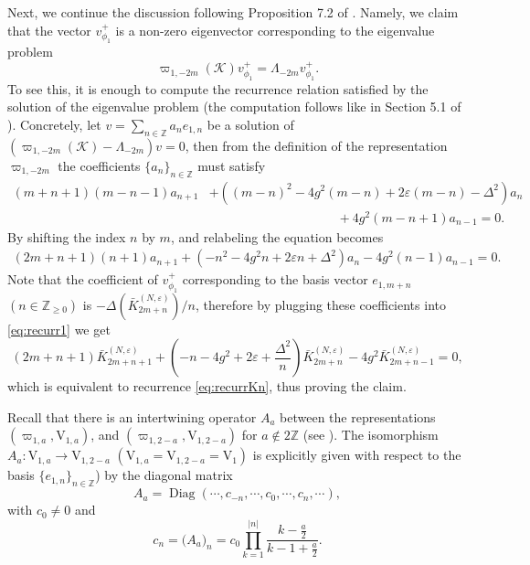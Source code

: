 \documentclass[11pt]{article}
\numberwithin{equation}{section}
\newcommand{\Z}{\mathbb{Z}} %
\newcommand{\e}{\varepsilon}
\DeclareMathOperator{\Diag}{Diag}
\newcommand{\RpnSymbol}[1]{\bm{\mathrm{#1}}}
\newcommand{\rV}{\RpnSymbol{V}}
\theoremstyle{plain}
\theoremstyle{definition}
\theoremstyle{remark}
\begin{document}
Next, we continue the discussion following Proposition 7.2 of \cite{W2016JPA}.
Namely, we claim that the vector \(v^+_{\phi_1}\) is a non-zero eigenvector corresponding to the eigenvalue problem
\begin{equation}
  \label{eq:Eigen$-2m$}
  \varpi_{1,-2m}(\mathcal{K})v^+_{\phi_1} = \Lambda_{-2m} v^+_{\phi_1}.
\end{equation}
To see this, it is enough to compute the recurrence relation satisfied by the solution of the eigenvalue problem (the computation
follows like in Section 5.1 of \cite{W2016JPA}). Concretely, let \( v = \sum_{n \in \Z} a_n e_{1,n} \) be a solution of
\(\left(\varpi_{1,-2m}(\mathcal{K}) - \Lambda_{-2m}\right) v=0\), then from the definition of the representation \(\varpi_{1,-2m}\) the
coefficients \(\{a_n\}_{n \in \Z} \) must satisfy
\begin{align*}
  (m+n+1) (m-n-1) a_{n+1} &+ \left( (m-n)^2 - 4g^2 (m-n) + 2\e (m-n) - \Delta^2 \right)a_n \\
  &\qquad \qquad \qquad \qquad \qquad + 4g^2 (m-n+1) a_{n-1} = 0.
\end{align*}
By shifting the index \(n\) by \(m\), and relabeling the equation becomes
\begin{align}
  \label{eq:recurr1}
  (2m+n+1)(n+1) a_{n+1} +\left( -n^2 - 4g^2 n + 2\e n + \Delta^2 \right) a_n - 4g^2 (n-1) a_{n-1} = 0.
\end{align}
Note that the coefficient of \( v^+_{\phi_1} \) corresponding to the basis vector \( e_{1,m+n} \) \((n \in \Z_{\geq 0}) \) is
\( -\Delta (\bar{K}^{(N,\e)}_{2m + n})/n \), therefore by plugging these coefficients into \eqref{eq:recurr1} we get
\begin{equation*}
  (2m+n+1) \bar{K}^{(N,\e)}_{2m+n+1} +\left( -n - 4g^2 + 2\e + \frac{\Delta^2}{n} \right)\bar{K}^{(N,\e)}_{2m+n}
   - 4g^2  \bar{K}^{(N,\e)}_{2m+n-1} = 0,
\end{equation*}
which is equivalent to recurrence \eqref{eq:recurrKn}, thus proving the claim.

Recall that there is an intertwining operator \(A_a\) between the representations \((\varpi_{1,a},\rV_{1,a})\), and \((\varpi_{1,2-a},\rV_{1,2-a}) \)
for \( a \not\in 2 \Z\) (see \cite{W2016JPA}). The isomorphism  \(A_a : \rV_{1,a} \to \rV_{1,2-a}\) $(\rV_{1,a}=\rV_{1,2-a}=\rV_1)$
is explicitly given with respect to the basis $\{e_{1,n}\}_{n\in \Z}$) by the diagonal matrix
\[
  A_a= \Diag(\cdots,c_{-n},\cdots,c_0,\cdots,c_n,\cdots),
\]
with \(c_0 \neq 0\) and
\[
  c_n =  \big(A_a\big)_n= c_0 \prod_{k=1}^{|n|} \frac{k-\frac{a}{2}}{k-1+\frac{a}{2}}.
\]
\end{document}

